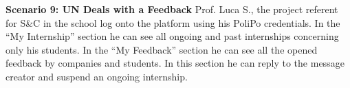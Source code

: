 \par{\textbf{Scenario 9: UN Deals with a Feedback}} Prof. Luca S., the project referent for S\&C in the school log onto
the platform using his PoliPo credentials. In the “My Internship” section he can see all ongoing and past internships
concerning only his students. In the “My Feedback” section he can see all the opened feedback by companies and
students. In this section he can reply to the message creator and suspend an ongoing internship.
